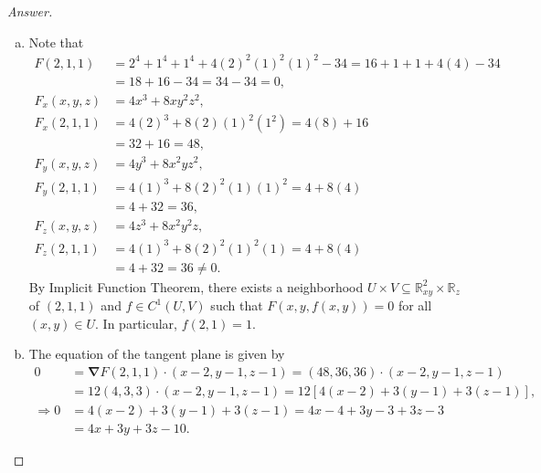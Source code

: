 \documentclass[12pt]{article}
\newcommand{\real}{\mathbb{R}}
\newcommand\paren[1]{\left( #1 \right)}
\newcommand{\sqbrack}[1]{\left [ #1 \right ]}
\newcommand{\Nabla}{\boldsymbol{\nabla}}
\theoremstyle{definition}
\begin{document}
\begin{proof}[Answer]
    \noindent 
    \begin{enumerate}[(a)]
        \item Note that 
        \begin{align*}
            F(2,1,1) & = 2^4 + 1^4 + 1^4 + 4(2)^2(1)^2(1)^2 - 34 = 16 + 1 + 1 + 4(4) - 34 \\ 
            & = 18 + 16 - 34 = 34 - 34 = 0 , \\ 
            F_x(x,y,z) & = 4x^3 + 8xy^2z^2 , \\ 
            F_x(2,1,1) & = 4(2)^3 + 8(2)(1)^2(1^2) = 4(8) + 16 \\ 
            & = 32 + 16 = 48 , \\ 
            F_y(x,y,z) & = 4y^3 + 8x^2yz^2 , \\ 
            F_y(2,1,1) & = 4(1)^3 + 8(2)^2(1)(1)^2 = 4 + 8(4) \\ 
            & = 4 + 32 = 36 , \\ 
            F_z(x,y,z) & = 4z^3 + 8x^2y^2z , \\
            F_z(2,1,1) & = 4(1)^3 + 8(2)^2(1)^2(1) = 4 + 8(4) \\ 
            & = 4 + 32 = 36 \neq 0 . 
        \end{align*}
        By Implicit Function Theorem, there exists a neighborhood $U \times V \subseteq \real^2_{xy} \times \real_z$ of $(2,1,1)$ and $f \in C^1(U,V)$ such that $F(x,y,f(x,y)) = 0$ for all $(x,y) \in U$. In particular, $f(2,1) = 1$. 
        \item The equation of the tangent plane is given by 
        \begin{align*}
            0 & = \Nabla F(2,1,1) \cdot (x - 2,y - 1,z - 1) = \paren{48,36,36} \cdot (x - 2,y - 1,z - 1) \\ 
            & = 12\paren{4,3,3} \cdot (x - 2,y - 1,z - 1) = 12 \sqbrack{ 4(x -2) + 3(y - 1) + 3(z-1) } , \\ 
            \Rightarrow 0 & = 4(x -2) + 3(y - 1) + 3(z-1) = 4x - 4 + 3y - 3 + 3z - 3 \\ 
            & = 4x + 3y + 3z - 10 . 
        \end{align*}
    \end{enumerate}
\end{proof}
\end{document}
